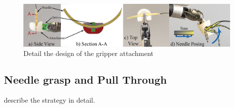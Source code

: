 \documentclass[0-suturing.tex]{subfiles}
\begin{document}
\begin{figure}[!t]
\centering
\includegraphics[width=\linewidth]{figures/NeedleGripper2-01}
\caption{Detail the design of the gripper attachment}
\label{fig:gripper design}
\vspace{-10pt}
\end{figure}

\subsection{Needle grasp and Pull Through}
describe the strategy in detail. 
\end{document}
